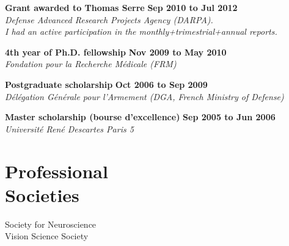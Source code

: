 \documentclass[margin,line]{resume}
\begin{document}
\begin{resume}
	\textbf{Grant awarded to Thomas Serre} \hfill \textbf{Sep 2010 to Jul 2012}\\
	\textsl{Defense Advanced Research Projects Agency (DARPA).\\ I had an active participation in the monthly+trimestrial+annual reports.}
	
	\textbf{4th year of Ph.D. fellowship} \hfill \textbf{Nov 2009 to May 2010}\\
	\textsl{Fondation pour la Recherche Médicale (FRM)}	
	
	\textbf{Postgraduate scholarship} \hfill \textbf{Oct 2006 to Sep 2009}\\ %
	\textsl{Délégation Générale pour l'Armement (DGA, French Ministry of Defense)}

	\textbf{Master scholarship (bourse d’excellence)} \hfill \textbf{Sep 2005 to Jun 2006}\\
	\textsl{Université René Descartes Paris 5}


%
%
%

	
	\vspace{3mm}
	\section{\mysidestyle Professional\\Societies}
	Society for Neuroscience\\
	Vision Science Society
	



\end{resume}
\end{document}
